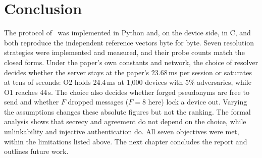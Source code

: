 \section{Conclusion}
The protocol of~\cite{base} was implemented in Python and, on the device side, in C, and both reproduce the independent reference vectors byte for byte. Seven resolution strategies were implemented and measured, and their probe counts match the closed forms. Under the paper's own constants and network, the choice of resolver decides whether the server stays at the paper's 23.68\,ms per session or saturates at tens of seconds: O2 holds 24.4\,ms at 1,000 devices with 5\% adversaries, while O1 reaches 44\,s. The choice also decides whether forged pseudonyms are free to send and whether $F$ dropped messages ($F=8$ here) lock a device out. Varying the assumptions changes these absolute figures but not the ranking. The formal analysis shows that secrecy and agreement do not depend on the choice, while unlinkability and injective authentication do. All seven objectives were met, within the limitations listed above. The next chapter concludes the report and outlines future work.

